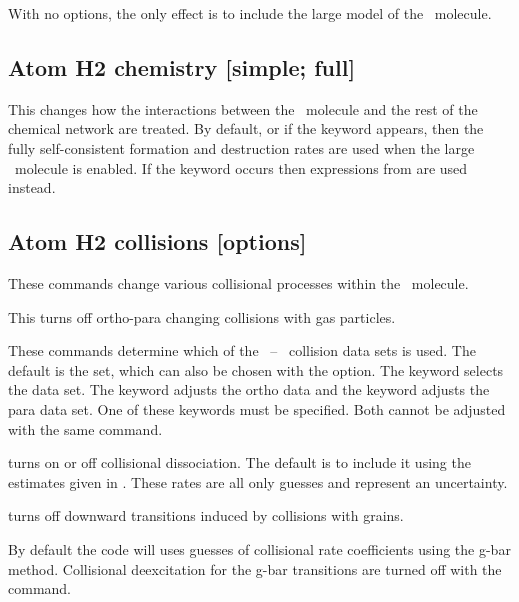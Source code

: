 With no options, the only effect is to include the large model of the
\htwo\ molecule.

\subsection{Atom H2 chemistry [simple; full]}

This changes how the interactions between the \htwo\ molecule
and the rest of the chemical network are treated.
By default, or if the keyword
appears, then the fully self-consistent formation and destruction rates
are used when the large \htwo\ molecule is enabled.
If the keyword
 occurs
then expressions from \citet{Tielens1985a} are used instead.

\subsection{Atom H2 collisions [options]}

These commands change various collisional processes within
the \htwo\ molecule.


This turns off
ortho-para changing
collisions with gas particles.



These commands determine which of the \htwo\ -- \htwo\ collision data
sets is used.
The default is the \citet{LeeH2H22008} set, which can also
be chosen with the  option.
The keyword  selects the
\citet{LeBourlot1999} data set.
The keyword  adjusts the ortho data and the
keyword  adjusts the para data set.
One of these keywords must be specified.  Both cannot be adjusted
with the same command.

turns on or off collisional dissociation.
The default is to include it using the estimates given in
\citet{Shaw2005}.
These rates are all only guesses and represent an
uncertainty.

 turns off downward
transitions induced by collisions with grains.

By default the code will uses guesses of collisional rate coefficients
using the g-bar method.
Collisional deexcitation for the g-bar transitions
are turned off with the  command.

